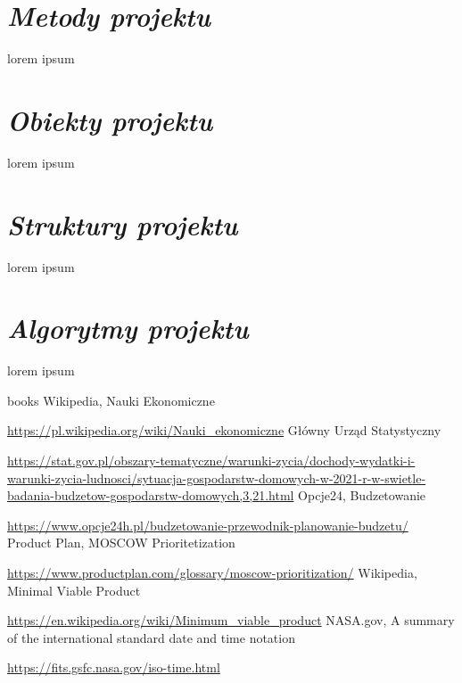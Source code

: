 \documentclass[a4paper,10pt]{report}
\newcommand{\customstylesection}[1]{\textbf{\textit{#1}}}
\begin{document}
\section{\customstylesection{Metody projektu}}
{lorem ipsum}

\section{\customstylesection{Obiekty projektu}}
{lorem ipsum}

\section{\customstylesection{Struktury projektu}}
{lorem ipsum}

\section{\customstylesection{Algorytmy projektu}}
{lorem ipsum}

\begin{thebibliography} {books}
 Wikipedia, Nauki Ekonomiczne \raggedright\url{
    https://pl.wikipedia.org/wiki/Nauki_ekonomiczne}
 Główny Urząd Statystyczny \raggedright\url{
    https://stat.gov.pl/obszary-tematyczne/warunki-zycia/dochody-wydatki-i-warunki-zycia-ludnosci/sytuacja-gospodarstw-domowych-w-2021-r-w-swietle-badania-budzetow-gospodarstw-domowych,3,21.html}
 Opcje24, Budzetowanie \raggedright\url{
    https://www.opcje24h.pl/budzetowanie-przewodnik-planowanie-budzetu/}
 Product Plan, MOSCOW Prioritetization \raggedright\url{
    https://www.productplan.com/glossary/moscow-prioritization/}
 Wikipedia, Minimal Viable Product \raggedright\url{
    https://en.wikipedia.org/wiki/Minimum_viable_product}
 NASA.gov, A summary of the international standard date and time notation \raggedright\url{
    https://fits.gsfc.nasa.gov/iso-time.html}
    
\end{thebibliography}

\listoffigures

\listoftables
\lstlistoflistings
\end{document}
